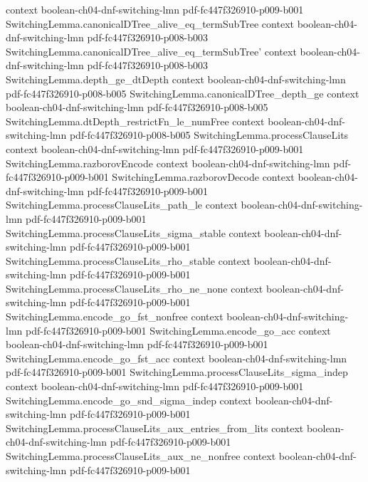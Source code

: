 \begin{theorem}
  {context}
  {boolean-ch04-dnf-switching-lmn}
  {pdf-fc447f326910-p009-b001}
\proofstep
  {SwitchingLemma.canonicalDTree_alive_eq_termSubTree}
  {context}
  {boolean-ch04-dnf-switching-lmn}
  {pdf-fc447f326910-p008-b003}
\proofstep
  {SwitchingLemma.canonicalDTree_alive_eq_termSubTree'}
  {context}
  {boolean-ch04-dnf-switching-lmn}
  {pdf-fc447f326910-p008-b003}
\proofstep
  {SwitchingLemma.depth_ge_dtDepth}
  {context}
  {boolean-ch04-dnf-switching-lmn}
  {pdf-fc447f326910-p008-b005}
\proofstep
  {SwitchingLemma.canonicalDTree_depth_ge}
  {context}
  {boolean-ch04-dnf-switching-lmn}
  {pdf-fc447f326910-p008-b005}
\proofstep
  {SwitchingLemma.dtDepth_restrictFn_le_numFree}
  {context}
  {boolean-ch04-dnf-switching-lmn}
  {pdf-fc447f326910-p008-b005}
\proofstep
  {SwitchingLemma.processClauseLits}
  {context}
  {boolean-ch04-dnf-switching-lmn}
  {pdf-fc447f326910-p009-b001}
\proofstep
  {SwitchingLemma.razborovEncode}
  {context}
  {boolean-ch04-dnf-switching-lmn}
  {pdf-fc447f326910-p009-b001}
\proofstep
  {SwitchingLemma.razborovDecode}
  {context}
  {boolean-ch04-dnf-switching-lmn}
  {pdf-fc447f326910-p009-b001}
\proofstep
  {SwitchingLemma.processClauseLits_path_le}
  {context}
  {boolean-ch04-dnf-switching-lmn}
  {pdf-fc447f326910-p009-b001}
\proofstep
  {SwitchingLemma.processClauseLits_sigma_stable}
  {context}
  {boolean-ch04-dnf-switching-lmn}
  {pdf-fc447f326910-p009-b001}
\proofstep
  {SwitchingLemma.processClauseLits_rho_stable}
  {context}
  {boolean-ch04-dnf-switching-lmn}
  {pdf-fc447f326910-p009-b001}
\proofstep
  {SwitchingLemma.processClauseLits_rho_ne_none}
  {context}
  {boolean-ch04-dnf-switching-lmn}
  {pdf-fc447f326910-p009-b001}
\proofstep
  {SwitchingLemma.encode_go_fst_nonfree}
  {context}
  {boolean-ch04-dnf-switching-lmn}
  {pdf-fc447f326910-p009-b001}
\proofstep
  {SwitchingLemma.encode_go_acc}
  {context}
  {boolean-ch04-dnf-switching-lmn}
  {pdf-fc447f326910-p009-b001}
\proofstep
  {SwitchingLemma.encode_go_fst_acc}
  {context}
  {boolean-ch04-dnf-switching-lmn}
  {pdf-fc447f326910-p009-b001}
\proofstep
  {SwitchingLemma.processClauseLits_sigma_indep}
  {context}
  {boolean-ch04-dnf-switching-lmn}
  {pdf-fc447f326910-p009-b001}
\proofstep
  {SwitchingLemma.encode_go_snd_sigma_indep}
  {context}
  {boolean-ch04-dnf-switching-lmn}
  {pdf-fc447f326910-p009-b001}
\proofstep
  {SwitchingLemma.processClauseLits_aux_entries_from_lits}
  {context}
  {boolean-ch04-dnf-switching-lmn}
  {pdf-fc447f326910-p009-b001}
\proofstep
  {SwitchingLemma.processClauseLits_aux_ne_nonfree}
  {context}
  {boolean-ch04-dnf-switching-lmn}
  {pdf-fc447f326910-p009-b001}

\end{theorem}
